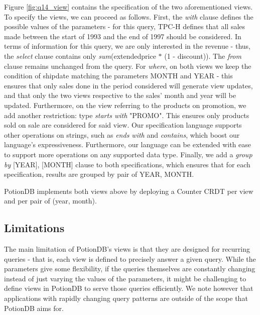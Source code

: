 \documentclass[sigplan,review,anonymous]{acmart}
\begin{document}
Figure \ref{fig:q14_view} contains the specification of the two aforementioned views.
To specify the views, we can proceed as follows.
First, the \emph{with} clause defines the possible values of the parameters - for this query, TPC-H defines that all sales made between the start of 1993 and the end of 1997 should be considered.
In terms of information for this query, we are only interested in the revenue - thus, the \emph{select} clause contains only \emph{sum}(extendedprice $*$ (1 - discount)). %
The \emph{from} clause remains unchanged from the query.
For \emph{where}, on both views we keep the condition of shipdate matching the parameters MONTH and YEAR - this ensures that only sales done in the period considered will generate view updates, and that only the two views respective to the sales' month and year will be updated.
Furthermore, on the view referring to the products on promotion, we add another restriction: type \emph{starts with} "PROMO".
This ensures only products sold on sale are considered for said view.
Our specification language supports other operations on strings, such as \emph{ends with} and \emph{contains}, which boost our language's expressiveness.	%
Furthermore, our language can be extended with ease to support more operations on any supported data type.
Finally, we add a \emph{group by} [YEAR], [MONTH] clause to both specifications, which ensures that for each specification, results are grouped by pair of YEAR, MONTH. %

PotionDB implements both views above by deploying a Counter CRDT per view and per pair of (year, month). %

\subsection{Limitations}	%
\label{subsec:limitations}

The main limitation of PotionDB's views is that they are designed for recurring queries - that is, each view is defined to precisely answer a given query.
While the parameters give some flexibility, if the queries themselves are constantly changing instead of just varying the values of the parameters, it might be challenging to define views in PotionDB to serve those queries efficiently.
We note however that applications with rapidly changing query patterns are outside of the scope that PotionDB aims for.
\end{document}
